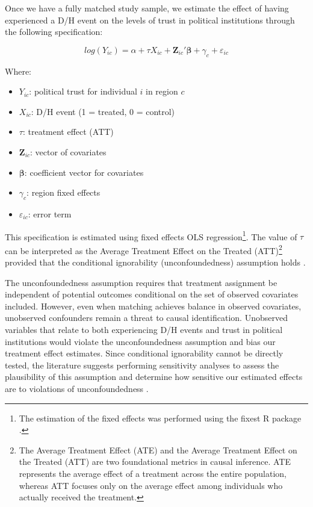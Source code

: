 \documentclass{article}
\begin{document}
Once we have a fully matched study sample, we estimate the effect of having experienced a D/H event on the levels of trust in political institutions through the following specification:

\begin{equation}
\label{eq:1}
log(Y_{ic}) = \alpha + \tau X_{ic} + \mathbf{Z}_{ic}'\mathbf{\beta} + \gamma_c + \varepsilon_{ic}
\end{equation}

Where:
\begin{itemize}
  \item \( Y_{ic} \): political trust for individual \( i \) in region \( c \)
  \item \( X_{ic} \): D/H event (1 = treated, 0 = control)
  \item \( \tau \): treatment effect (ATT)
  \item \( \mathbf{Z}_{ic} \): vector of covariates
  \item \( \mathbf{\beta} \): coefficient vector for covariates
  \item \( \gamma_c \): region fixed effects
  \item \( \varepsilon_{ic} \): error term
\end{itemize}

This specification is estimated using fixed effects OLS regression\footnote{The estimation of the fixed effects was performed using the fixest R package \parencite{berge_efficient_2018}.}. The value of \( \tau \) can be interpreted as the Average Treatment Effect on the Treated (ATT)\footnote{The Average Treatment Effect (ATE) and the Average Treatment Effect on the Treated (ATT) are two foundational metrics in causal inference. ATE represents the average effect of a treatment across the entire population, whereas ATT focuses only on the average effect among individuals who actually received the treatment.} provided that the conditional ignorability (unconfoundedness) assumption holds \parencite{abadie_econometric_2018, greifer_matching_2021}.

The unconfoundedness assumption requires that treatment assignment be independent of potential outcomes conditional on the set of observed covariates included. However, even when matching achieves balance in observed covariates, unobserved confounders remain a threat to causal identification. Unobserved variables that relate to both experiencing D/H events and trust in political institutions would violate the unconfoundedness assumption and bias our treatment effect estimates. Since conditional ignorability cannot be directly tested, the literature suggests performing sensitivity analyses to assess the plausibility of this assumption and determine how sensitive our estimated effects are to violations of unconfoundedness \parencite{stuart_matching_2010}.
\end{document}
